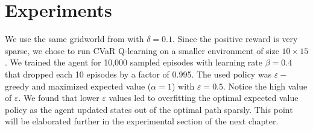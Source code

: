 \clearpage


%    		


%    
%		
%	



\section{Experiments}\label{sec:qexperiments}
We use the same gridworld from  with $\delta=0.1$. Since the positive reward is very sparse, we chose to run CVaR Q-learning on a smaller environment of size $10\times15$. We trained the agent for 10,000 sampled episodes with learning rate $\beta=0.4$ that dropped each 10 episodes by a factor of 0.995. The used policy was $\varepsilon-$greedy and maximized expected value ($\alpha=1$) with $\varepsilon=0.5$. Notice the high value of $\varepsilon$. We found that lower $\varepsilon$ values led to overfitting the optimal expected value policy as the agent updated states out of the optimal path sparsly. This point will be elaborated further in the experimental section of the next chapter.

